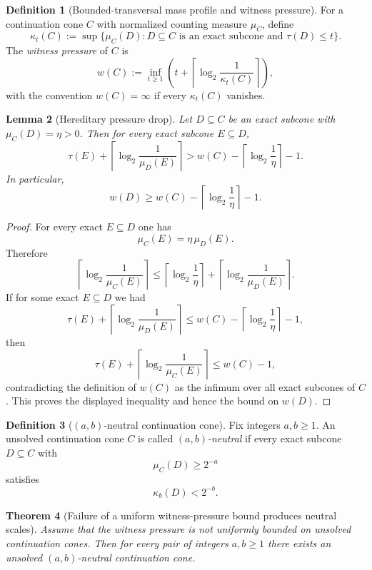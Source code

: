 \documentclass[11pt]{article}
\newtheorem{theorem}{Theorem}[section]
\newtheorem{lemma}[theorem]{Lemma}
\theoremstyle{definition}
\newtheorem{definition}[theorem]{Definition}
\newcommand{\1}{\mathbf{1}}
\begin{document}
\begin{definition}[Bounded-transversal mass profile and witness pressure]\label{def:witness-pressure}
For a continuation cone $C$ with normalized counting measure $\mu_C$, define
\[
\kappa_t(C):=
\sup\bigl\{\mu_C(D): D\subseteq C\text{ is an exact subcone and }\tau(D)\le t\bigr\}.
\]
The \emph{witness pressure} of $C$ is
\[
w(C):=\inf_{t\ge 1}\left(t+\left\lceil \log_2\frac{1}{\kappa_t(C)}\right\rceil\right),
\]
with the convention $w(C)=\infty$ if every $\kappa_t(C)$ vanishes.
\end{definition}

\begin{lemma}[Hereditary pressure drop]\label{lem:hereditary-pressure-drop}
Let $D\subseteq C$ be an exact subcone with $\mu_C(D)=\eta>0$.
Then for every exact subcone $E\subseteq D$,
\[
\tau(E)+\left\lceil \log_2\frac{1}{\mu_D(E)}\right\rceil
>
w(C)-\left\lceil \log_2\frac{1}{\eta}\right\rceil-1.
\]
In particular,
\[
w(D)\ge w(C)-\left\lceil \log_2\frac{1}{\eta}\right\rceil-1.
\]
\end{lemma}

\begin{proof}
For every exact $E\subseteq D$ one has
\[
\mu_C(E)=\eta\,\mu_D(E).
\]
Therefore
\[
\left\lceil \log_2\frac{1}{\mu_C(E)}\right\rceil
\le
\left\lceil \log_2\frac{1}{\eta}\right\rceil
+
\left\lceil \log_2\frac{1}{\mu_D(E)}\right\rceil.
\]
If for some exact $E\subseteq D$ we had
\[
\tau(E)+\left\lceil \log_2\frac{1}{\mu_D(E)}\right\rceil
\le
w(C)-\left\lceil \log_2\frac{1}{\eta}\right\rceil-1,
\]
then
\[
\tau(E)+\left\lceil \log_2\frac{1}{\mu_C(E)}\right\rceil
\le
w(C)-1,
\]
contradicting the definition of $w(C)$ as the infimum over all exact subcones of $C$.
This proves the displayed inequality and hence the bound on $w(D)$.
\end{proof}

\begin{definition}[$(a,b)$-neutral continuation cone]\label{def:ab-neutral-cone}
Fix integers $a,b\ge 1$.
An unsolved continuation cone $C$ is called \emph{$(a,b)$-neutral} if every exact subcone $D\subseteq C$ with
\[
\mu_C(D)\ge 2^{-a}
\]
satisfies
\[
\kappa_b(D)<2^{-b}.
\]
\end{definition}

\begin{theorem}[Failure of a uniform witness-pressure bound produces neutral scales]\label{thm:witness-pressure-neutral-scales}
Assume that the witness pressure is not uniformly bounded on unsolved continuation cones.
Then for every pair of integers $a,b\ge 1$ there exists an unsolved $(a,b)$-neutral continuation cone.
\end{theorem}
\end{document}
